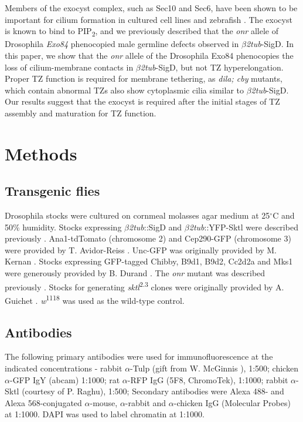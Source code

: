 \documentclass[12pt, twoside, letterpaper]{article}
\newcommand{\PIP}{PIP\textsubscript{2}}
\newcommand{\sigd}{$\beta$\textit{2tub}-SigD}
\begin{document}
Members of the exocyst complex, such as Sec10 and Sec6, have been shown
to be important for cilium formation in cultured cell lines and zebrafish
\citep{zuo2009exocyst, lobo2017exocyst, seixas2016arl13b}.
The exocyst is known to bind to \PIP{}, and we previously described that
the \textit{onr} allele of Drosophila \textit{Exo84} phenocopied
male germline defects observed in \sigd{}.
In this paper, we show that the \textit{onr} allele of the Drosophila Exo84
phenocopies the loss of cilium-membrane contacts in \sigd{},
but not TZ hyperelongation.
Proper TZ function is required for membrane tethering, as \textit{dila; cby}
mutants, which contain abnormal TZs also show cytoplasmic cilia similar to
\sigd{}.
Our results suggest that the exocyst is required after the initial stages
of TZ assembly and maturation for TZ function.


\section{Methods}
\subsection{Transgenic flies}
Drosophila stocks were cultured on cornmeal molasses agar medium at 25$^{\circ}$C
and 50\% humidity.
Stocks expressing $\beta$\textit{2tub}::SigD and $\beta$\textit{2tub}::YFP-Sktl
were described previously \citep{wei2008depletion, fabian2010phosphatidylinositol}.
Ana1-tdTomato (chromosome 2) and Cep290-GFP (chromosome 3) were provided
by T. Avidor-Reiss \citep{basiri2014migrating}.
Unc-GFP was originally provided by M. Kernan \citep{baker2004mechanosensory}.
Stocks expressing GFP-tagged Chibby, B9d1, B9d2, Cc2d2a and Mks1 were generously
provided by B. Durand \citep{enjolras2012drosophila, vieillard2016transition}.
The \textit{onr} mutant was described previously \citep{giansanti2015exocyst}.
Stocks for generating \textit{sktl}\textsuperscript{2.3} clones were originally provided by
A. Guichet \citep{gervais2008pip5k}.
\textit{w}\textsuperscript{1118} was used as the wild-type control.

\subsection{Antibodies}
The following primary antibodies were used for immunofluorescence
at the indicated concentrations - 
rabbit $\alpha$-Tulp (gift from W. McGinnis \citep{ronshaugen2002structure}), 1:500; 
chicken $\alpha$-GFP IgY (abcam) 1:1000;
rat $\alpha$-RFP IgG (5F8, ChromoTek), 1:1000;
rabbit $\alpha$-Sktl (courtesy of P. Raghu), 1:500;
Secondary antibodies were Alexa 488- and Alexa 568-conjugated
$\alpha$-mouse, $\alpha$-rabbit and $\alpha$-chicken
IgG (Molecular Probes) at 1:1000.
DAPI was used to label chromatin at 1:1000.
\end{document}
